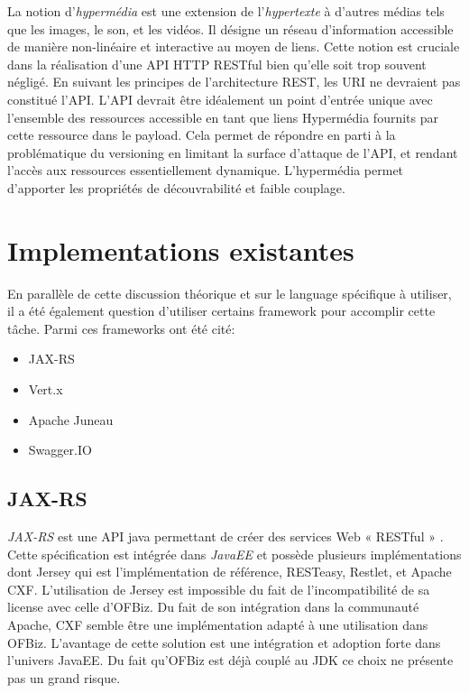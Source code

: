 \documentclass[a4paper, 11pt]{report}
\begin{document}
La notion d'\emph{hypermédia} est une extension de l'\emph{hypertexte}
à d'autres médias tels que les images, le son, et les vidéos.  Il
désigne un réseau d'information accessible de manière non-linéaire et
interactive au moyen de liens.  Cette notion est cruciale dans la
réalisation d'une API HTTP RESTful bien qu'elle soit trop souvent
négligé.  En suivant les principes de l'architecture REST, les URI ne
devraient pas constitué l'API.  L'API devrait être idéalement un point
d'entrée unique avec l'ensemble des ressources accessible en tant que
liens Hypermédia fournits par cette ressource dans le payload. Cela
permet de répondre en parti à la problématique du versioning en
limitant la surface d'attaque de l'API, et rendant l'accès aux
ressources essentiellement dynamique.  L'hypermédia permet d'apporter
les propriétés de découvrabilité et faible couplage.

\section{Implementations existantes}

En parallèle de cette discussion théorique et sur le language
spécifique à utiliser, il a été également question d'utiliser certains
framework pour accomplir cette tâche. Parmi ces frameworks ont été
cité:

\begin{itemize}
\item JAX-RS
\item Vert.x
\item Apache Juneau
\item Swagger.IO
\end{itemize}

\subsection{JAX-RS}

\emph{JAX-RS} est une API java permettant de créer des services Web «
RESTful » \cite{pericas2013jax}. Cette spécification est intégrée dans
\emph{JavaEE} et possède plusieurs implémentations dont Jersey qui est
l'implémentation de référence, RESTeasy, Restlet, et Apache CXF.
L'utilisation de Jersey est impossible du fait de l'incompatibilité de
sa license avec celle d'OFBiz.  Du fait de son intégration dans la
communauté Apache, CXF semble être une implémentation adapté à une
utilisation dans OFBiz.  L'avantage de cette solution est une
intégration et adoption forte dans l'univers JavaEE.  Du fait qu'OFBiz
est déjà couplé au JDK ce choix ne présente pas un grand risque.
\end{document}
